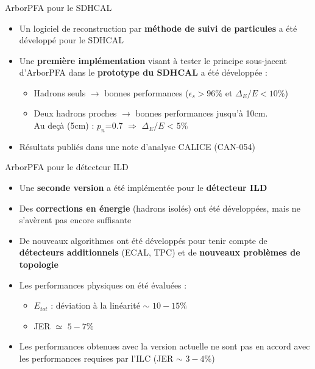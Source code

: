 \documentclass[8pt]{beamer}
\begin{document}
  \begin{frame}
  \frametitle{\secname}
  \framesubtitle{\subsecname}
    \begin{block}{ArborPFA pour le SDHCAL}
      \begin{itemize}
        \item Un logiciel de reconstruction par \textbf{méthode de suivi de particules} a été développé pour le SDHCAL
        \item Une \textbf{première implémentation} visant à tester le principe sous-jacent d'ArborPFA dans le \textbf{prototype du SDHCAL} a été développée :
        \begin{itemize}
          \item Hadrons seuls $\rightarrow$ bonnes performances ($\epsilon_s > 96\%$ et $\Delta_E/E < 10\%$)
          \item Deux hadrons proches $\rightarrow$ bonnes performances jusqu'à 10cm. \\
          Au deçà (5cm) : $p_n$=0.7 $\Rightarrow$ $\Delta_E/E$ < $5\%$
        \end{itemize}
        \item Résultats publiés dans une note d'analyse CALICE (CAN-054)
      \end{itemize}
    \end{block}
    \begin{block}{ArborPFA pour le détecteur ILD}
      \begin{itemize}
        \item Une \textbf{seconde version} a été implémentée pour le \textbf{détecteur ILD}
        \item Des \textbf{corrections en énergie} (hadrons isolés) ont été développées, mais ne s'avèrent pas encore suffisante
        \item De nouveaux algorithmes ont été développés pour tenir compte de \textbf{détecteurs additionnels} (ECAL, TPC) et de \textbf{nouveaux problèmes de topologie}
        \item Les performances physiques on été évaluées :
        \begin{itemize}
          \item $E_{tot}$ : déviation à la linéarité $\sim$ $10-15\%$
          \item JER $\simeq$ $5-7\%$
        \end{itemize}
        \item Les performances obtenues avec la version actuelle ne sont pas en accord avec les performances requises par l'ILC (JER $\sim$ $3-4\%$)
      \end{itemize}
    \end{block}
  \end{frame}
\end{document}
